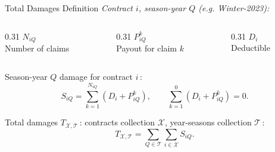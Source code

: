 \begin{frame}{Total Damages Definition}
  \small
  \textit{Contract $i$, season-year $Q$ (e.g. Winter-2023):}
  \vspace{0.15cm}

  \begin{columns}[T,onlytextwidth]
    \begin{column}{0.31\textwidth}
      \centering
      $N_{iQ}$\\[+0.05cm]
      \footnotesize Number of claims
    \end{column}
    \begin{column}{0.31\textwidth}
      \centering
      $P_{iQ}^{k}$\\[0.05cm]
      \footnotesize Payout for claim $k$
    \end{column}
    \begin{column}{0.31\textwidth}
      \centering
      $D_i$\\[+0.05cm]
      \footnotesize Deductible
    \end{column}
  \end{columns}

  \vspace{0.25cm}

  Season-year $Q$ damage for contract $i$\,:
  \begin{equation*}
    S_{iQ} = \sum_{k=1}^{N_{iQ}} \left(D_i + P_{iQ}^{k}\right),
    \qquad \sum_{k=1}^{0} \left(D_i + P_{iQ}^{k}\right) = 0.
  \end{equation*}

  Total damages $T_{\mathcal{X},\mathcal{T}}$\,:
  contracts collection $\mathcal{X}$, year-seasons collection
  $\mathcal{T}$\,:
  \begin{equation*}
    T_{\mathcal{X},\mathcal{T}}
    = \sum_{Q \in \mathcal{T}} \sum_{i \in \mathcal{X}} S_{iQ}.
  \end{equation*}

\end{frame}

